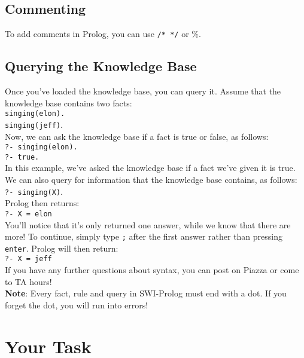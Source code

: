 \documentclass{article}
\begin{document}
\subsection{Commenting}
To add comments in Prolog, you can use \verb|/* */| or $\%$.


\subsection{Querying the Knowledge Base}
Once you've loaded the knowledge base, you can query it. Assume that the knowledge base contains two facts:\\

\verb|singing(elon).|\\
\verb|singing(jeff)|.\\

Now, we can ask the knowledge base if a fact is true or false, as follows:\\

\verb|?- singing(elon).|\\
\verb|?- true.|\\

In this example, we've asked the knowledge base if a fact we've given it is true. We can also query for information that the knowledge base contains, as follows:\\

\verb|?- singing(X)|.\\

Prolog then returns:\\
\verb|?- X = elon|\\

You'll notice that it's only returned one answer, while we know that there are more! To continue, simply type \verb|;| after the first answer rather than pressing \verb|enter|. Prolog will then return:\\

\verb|?- X = jeff|\\

 If you have any further questions about syntax, you can post on Piazza or come to TA hours!\\

\textbf{Note}: Every fact, rule and query in SWI-Prolog must end with a dot. If you forget the dot, you will run into errors!
\section{Your Task}
\end{document}
